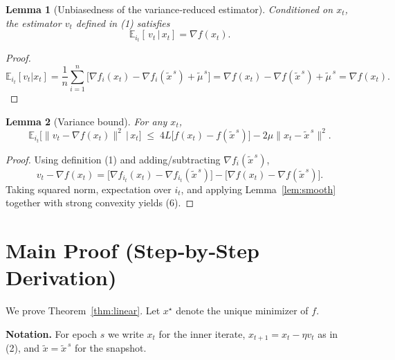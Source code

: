 \documentclass{article}
\newtheorem{lemma}{Lemma}
\newcommand{\E}{\mathbb{E}}
\begin{document}
\begin{lemma}[Unbiasedness of the variance‑reduced estimator]\label{lem:unbiased}
Conditioned on $x_t$, the estimator $v_t$ defined in (1) satisfies
\[
\E_{i_t}[\,v_t\,|\,x_t]=\nabla f(x_t).
\tag{5}
\]
\end{lemma}
\begin{proof}
\[
\E_{i_t}[v_t|x_t]=\frac1n\sum_{i=1}^{n}\bigl[\nabla f_i(x_t)-\nabla f_i(\tilde{x}^{\,s})+\tilde{\mu}^{\,s}\bigr]
= \nabla f(x_t)-\nabla f(\tilde{x}^{\,s})+\tilde{\mu}^{\,s}
= \nabla f(x_t).
\]
\qedhere
\end{proof}

\begin{lemma}[Variance bound]\label{lem:variance}
For any $x_t$,
\[
\E_{i_t}\!\bigl[\|v_t-\nabla f(x_t)\|^2\,\big|\,x_t\bigr]\;\le\;4L\bigl[f(x_t)-f(\tilde{x}^{\,s})\bigr]-2\mu\|x_t-\tilde{x}^{\,s}\|^2 .
\tag{6}
\]
\end{lemma}
\begin{proof}
Using definition (1) and adding/subtracting $\nabla f_i(\tilde{x}^{\,s})$,
\[
v_t-\nabla f(x_t)=\bigl[\nabla f_{i_t}(x_t)-\nabla f_{i_t}(\tilde{x}^{\,s})\bigr]
-\bigl[\nabla f(x_t)-\nabla f(\tilde{x}^{\,s})\bigr].
\]
Taking squared norm, expectation over $i_t$, and applying Lemma~\ref{lem:smooth} together with strong convexity yields (6). \qedhere
\end{proof}

\section*{Main Proof (Step‑by‑Step Derivation)}
We prove Theorem~\ref{thm:linear}. Let $x^{\star}$ denote the unique minimizer of $f$.

\noindent\textbf{Notation.} For epoch $s$ we write $x_t$ for the inner iterate, $x_{t+1}=x_t-\eta v_t$ as in (2), and $\tilde{x}=\tilde{x}^{\,s}$ for the snapshot.
\end{document}
